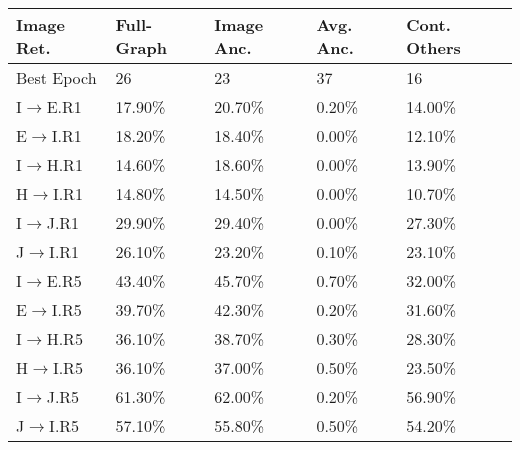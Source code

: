 \begin{table}
    \centering
\begin{tabular}{lllll}
\toprule
{Image Ret.} & Full-Graph & Image Anc. & Avg. Anc. & Cont. Others \\
\midrule
Best Epoch  &                      26 &                            23 &                   37 &                           16 \\
\midrule
I$\rightarrow$E.R1     &                  17.90\% &                       20.70\% &                0.20\% &                        14.00\% \\
E$\rightarrow$I.R1     &                  18.20\% &                       18.40\% &                0.00\% &                        12.10\% \\
\midrule
I$\rightarrow$H.R1     &                  14.60\% &                       18.60\% &                0.00\% &                        13.90\% \\
H$\rightarrow$I.R1     &                  14.80\% &                       14.50\% &                0.00\% &                        10.70\% \\
\midrule
I$\rightarrow$J.R1     &                  29.90\% &                       29.40\% &                0.00\% &                        27.30\% \\
J$\rightarrow$I.R1     &                  26.10\% &                       23.20\% &                0.10\% &                        23.10\% \\
\midrule
\midrule
I$\rightarrow$E.R5     &                  43.40\% &                       45.70\% &                0.70\% &                        32.00\% \\
E$\rightarrow$I.R5     &                  39.70\% &                       42.30\% &                0.20\% &                        31.60\% \\
\midrule
I$\rightarrow$H.R5     &                  36.10\% &                       38.70\% &                0.30\% &                        28.30\% \\
H$\rightarrow$I.R5     &                  36.10\% &                       37.00\% &                0.50\% &                        23.50\% \\
\midrule
I$\rightarrow$J.R5     &                  61.30\% &                       62.00\% &                0.20\% &                        56.90\% \\
J$\rightarrow$I.R5     &                  57.10\% &                       55.80\% &                0.50\% &                        54.20\% \\

\end{tabular}
\end{table}
